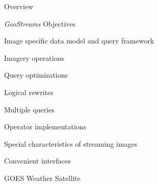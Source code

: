 \documentclass[final,total,bgColor,slideColor,pdf,ps2pdf,default,noaccumulate]{prosper}
\begin{document}
\begin{slide}{Overview}
%  
  
\end{slide}

\begin{slide}[R]{\emph{GeoStreams} Objectives}
  \begin{Itemize}

  \item Image specific data model and query framework

  \item Imagery operations
 
  \item Query optimizations

    \begin{Itemize}
    \item Logical rewrites
    \item Multiple queries
    \end{Itemize}

  \item Operator implementations

    \begin{Itemize}
    \item Special characteristics of streaming images
    \end{Itemize}

  \item Convenient interfaces

  \end{Itemize}
\end{slide}

\begin{slide}{GOES Weather Satellite}
  
\end{slide}
\end{document}
